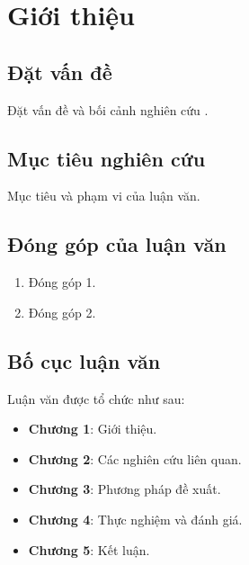 \chapter{Giới thiệu}
\label{Chapter1}


\section{Đặt vấn đề}

Đặt vấn đề và bối cảnh nghiên cứu \cite{adams2023}.

\section{Mục tiêu nghiên cứu}

Mục tiêu và phạm vi của luận văn.

\section{Đóng góp của luận văn}

\begin{enumerate}
    \item Đóng góp 1.
    \item Đóng góp 2.
\end{enumerate}

\section{Bố cục luận văn}

Luận văn được tổ chức như sau:

\begin{itemize}
    \item \textbf{Chương 1}: Giới thiệu.
    \item \textbf{Chương 2}: Các nghiên cứu liên quan.
    \item \textbf{Chương 3}: Phương pháp đề xuất.
    \item \textbf{Chương 4}: Thực nghiệm và đánh giá.
    \item \textbf{Chương 5}: Kết luận.
\end{itemize}
